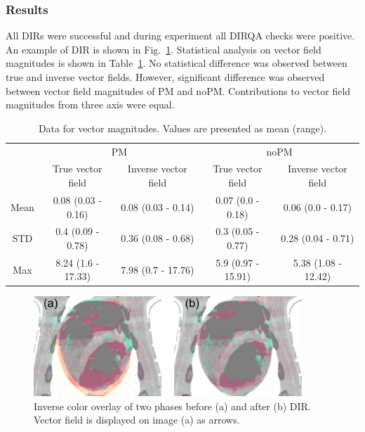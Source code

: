 \documentclass[type=dr, dr=rernat, accentcolor=tud7b,colorbacktitle, bigchapter, openright, twoside, 12pt ]{tudthesis}
\begin{document}
\subsubsection{Results}


All DIRs were successful and during experiment all DIRQA checks were positive. An example of DIR is shown in Fig.~\ref{exampleReg_pigs}. Statistical analysis on vector field magnitudes is shown in Table~\ref{tab:vectordata_pig}. No statistical difference was
observed between true and inverse vector fields. However, significant difference was observed between vector field magnitudes of PM and noPM. Contributions to vector field magnitudes from three axis were equal. 


\begin{table}[H]
  \centering
  \caption{Data for vector magnitudes. Values are presented as mean (range).}
  \begin{tabular}{c|c|c|c|c}
	    & \multicolumn{2}{|c|}{PM} & \multicolumn{2}{|c|}{noPM} \\
  
            & True vector field   & Inverse vector field   & True vector field  & Inverse vector field \\
       \hline
	Mean & 0.08 (0.03 - 0.16) & 0.08 (0.03 - 0.14) & 0.07 (0.0 - 0.18)  & 0.06 (0.0 - 0.17) \\ 
	STD  & 0.4 (0.09 - 0.78)  & 0.36 (0.08 - 0.68) & 0.3 (0.05 - 0.77)  & 0.28 (0.04 - 0.71) \\ 
	Max  & 8.24 (1.6 - 17.33) & 7.98 (0.7 - 17.76) & 5.9 (0.97 - 15.91) & 5.38 (1.08 - 12.42) \\ 
    \hline\hline
  \end{tabular}
  \label{tab:vectordata_pig}
\end{table}

\begin{figure}[H]
	\begin{center}		
		\includegraphics[width=0.9\textwidth]{./Images/exampleReg_pigs.png}
		\caption{Inverse color overlay of two phases before (a) and after (b) DIR. Vector field is displayed on image (a) as arrows.}
		\label{exampleReg_pigs}
	\end{center}
\end{figure}
\end{document}
